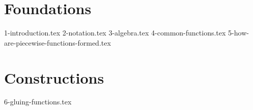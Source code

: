 \documentclass[10pt,a4paper]{article}
\begin{document}
\maketitle
\tableofcontents
\newpage

\part{Foundations}
{1-introduction.tex}
{2-notation.tex}
{3-algebra.tex}
{4-common-functions.tex}
{5-how-are-piecewise-functions-formed.tex}

\part{Constructions}
{6-gluing-functions.tex}
\end{document}
